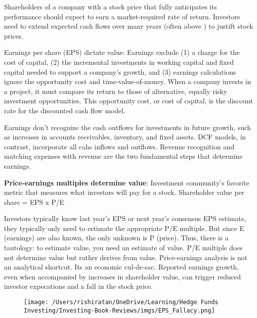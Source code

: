 \documentclass[english,titlepage]{article}
\begin{document}
\begin{tcolorbox}[colback=blue!5!white,colframe=blue!75!black]
    Shareholders of a company with a stock price that fully anticipates its performance should expect to earn a market-required rate of return. Investors need to extend expected cash flows over many years (often above ) to justift stock prices. 
\end{tcolorbox}
Earnings per share (EPS) dictate value: Earnings exclude (1) a charge for the cost of capital, (2) the incremental investments in working capital and fixed capital needed to support a company's growth, and (3) earnings calculations ignore the opportunity cost and time-value-of-money. 
\vspace {0.3 cm}
  \newline When a company invests in a project, it must compare its return to those of alternative, equally risky investment opportunities. This opportunity cost, or cost of capital, is the discount rate for the discounted cash flow model. 

\begin{tcolorbox}[colback=blue!5!white,colframe=blue!75!black]
    Earnings don't recognize the cash outflows for investments in future growth, such as increases in accounts receivables, inventory, and fixed assets. 
    DCF models, in contrast, incorporate all cahs inflows and outflows. 
    \vspace {0.025 cm}
  \newline Revenue recognition and matching expenses with revenue are the two fundamental steps that determine earnings. 
\end{tcolorbox}

\textbf{Price-earnings multiples determine value}: Investment community's favorite metric that measures what investors will pay for a stock. Shareholder value per share = EPS x P/E
\begin{tcolorbox}[colback=blue!5!white,colframe=blue!75!black]
Investors typically know last year's EPS or next year's consensus EPS estimate, they typically only need to estimate the appropriate P/E multiple. But since E (earnings) are also known, the only unknown is P (price). 
\vspace {0.3 cm}
  \newline
  Thus, there is a tautology: to estimate value, you need an estimate of value. 
  P/E multiple does not determine value but rather derives from value. Price-earnings analysis is not an analytical shortcut. Its an economic cul-de-sac. Reported earnings growth, even when accompanied by increases in shareholder value, can trigger reduced investor expecations and a fall in the stock price. 
\end{tcolorbox}
\begin{figure}[H]
    \centering
              \texttt{[image: /Users/rishiratan/OneDrive/Learning/Hedge Funds Investing/Investing-Book-Reviews/imgs/EPS\_Fallacy.png]}
\label{fig:parametric}
\end{figure}
\end{document}
